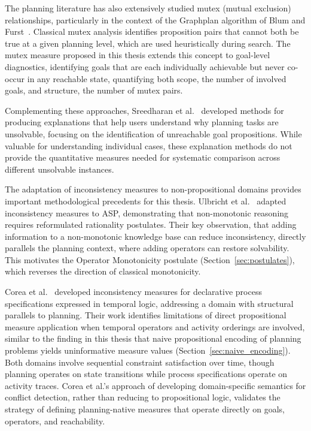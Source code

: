 The planning literature has also extensively studied mutex (mutual exclusion) relationships, particularly in the context of the Graphplan algorithm of Blum and Furst~\cite{Blum1997}. Classical mutex analysis identifies proposition pairs that cannot both be true at a given planning level, which are used heuristically during search. The mutex measure proposed in this thesis extends this concept to goal-level diagnostics, identifying goals that are each individually achievable but never co-occur in any reachable state, quantifying both scope, the number of involved goals, and structure, the number of mutex pairs.

Complementing these approaches, Sreedharan et al.~\cite{Sreedharan2019} developed methods for producing explanations that help users understand why planning tasks are unsolvable, focusing on the identification of unreachable goal propositions. While valuable for understanding individual cases, these explanation methods do not provide the quantitative measures needed for systematic comparison across different unsolvable instances.

The adaptation of inconsistency measures to non-propositional domains provides important methodological precedents for this thesis. Ulbricht et al.~\cite{Ulbricht2016} adapted inconsistency measures to \ac{ASP}, demonstrating that non-monotonic reasoning requires reformulated rationality postulates. Their key observation, that adding information to a non-monotonic knowledge base can reduce inconsistency, directly parallels the planning context, where adding operators can restore solvability. This motivates the Operator Monotonicity postulate (Section~\ref{sec:postulates}), which reverses the direction of classical monotonicity.

Corea et al.~\cite{Corea2022} developed inconsistency measures for declarative process specifications expressed in temporal logic, addressing a domain with structural parallels to planning. Their work identifies limitations of direct propositional measure application when temporal operators and activity orderings are involved, similar to the finding in this thesis that naive propositional encoding of planning problems yields uninformative measure values (Section~\ref{sec:naive_encoding}). Both domains involve sequential constraint satisfaction over time, though planning operates on state transitions while process specifications operate on activity traces. Corea et al.'s approach of developing domain-specific semantics for conflict detection, rather than reducing to propositional logic, validates the strategy of defining planning-native measures that operate directly on goals, operators, and reachability.

